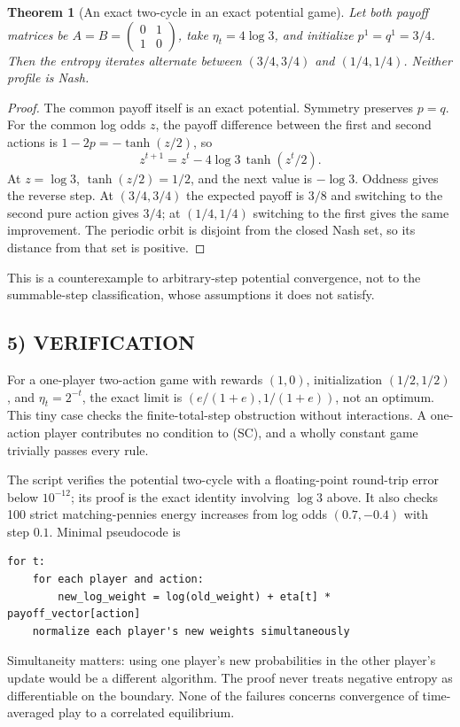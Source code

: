 \documentclass[11pt,a4paper]{article}
\newtheorem{theorem}{Theorem}[section]
\theoremstyle{definition}
\theoremstyle{remark}
\begin{document}
\begin{theorem}[An exact two-cycle in an exact potential game]
Let both payoff matrices be
$A=B=\left(\begin{smallmatrix}0&1\\1&0\end{smallmatrix}\right)$, take
$\eta_t=4\log3$, and initialize $p^1=q^1=3/4$. Then the entropy iterates alternate
between $(3/4,3/4)$ and $(1/4,1/4)$. Neither profile is Nash.
\end{theorem}
\begin{proof}
The common payoff itself is an exact potential. Symmetry preserves $p=q$.
For the common log odds $z$, the payoff difference between the first and second
actions is $1-2p=-\tanh(z/2)$, so
\[
 z^{t+1}=z^t-4\log3\,\tanh(z^t/2).
\]
At $z=\log3$, $\tanh(z/2)=1/2$, and the next value is $-\log3$.
Oddness gives the reverse step. At $(3/4,3/4)$ the expected payoff is $3/8$ and
switching to the second pure action gives $3/4$; at $(1/4,1/4)$ switching to the
first gives the same improvement. The periodic orbit is disjoint from the closed
Nash set, so its distance from that set is positive.
\end{proof}
This is a counterexample to arbitrary-step potential convergence, not to the
summable-step classification, whose assumptions it does not satisfy.

\subsection*{5) VERIFICATION}
For a one-player two-action game with rewards $(1,0)$, initialization $(1/2,1/2)$,
and $\eta_t=2^{-t}$, the exact limit is
$(e/(1+e),1/(1+e))$, not an optimum. This tiny case checks the finite-total-step
obstruction without interactions. A one-action player contributes no condition
to (SC), and a wholly constant game trivially passes every rule.

The script verifies the potential two-cycle with a floating-point round-trip
error below $10^{-12}$; its proof is the exact identity involving $\log3$ above.
It also checks 100 strict matching-pennies energy increases from log odds
$(0.7,-0.4)$ with step $0.1$. Minimal pseudocode is
\begin{lstlisting}
for t:
    for each player and action:
        new_log_weight = log(old_weight) + eta[t] * payoff_vector[action]
    normalize each player's new weights simultaneously
\end{lstlisting}
Simultaneity matters: using one player's new probabilities in the other player's
update would be a different algorithm. The proof never treats negative entropy
as differentiable on the boundary. None of the failures concerns convergence of
time-averaged play to a correlated equilibrium.
\end{document}
